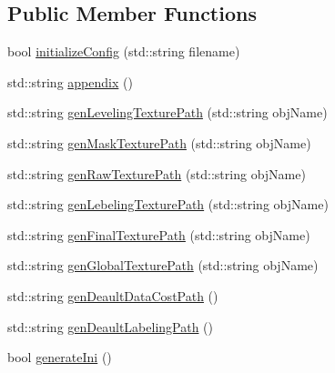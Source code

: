 \subsection*{Public Member Functions}
\begin{DoxyCompactItemize}
\item 
bool \hyperlink{struct_arguments_adb3df83131fa2be8783755b93c28c3de}{initialize\+Config} (std\+::string filename)
\item 
std\+::string \hyperlink{struct_arguments_a693a6a2a4334f5e34b3eb5ed6a555b28}{appendix} ()
\item 
std\+::string \hyperlink{struct_arguments_a84cff19e3bdd988ba096e1a81e747103}{gen\+Leveling\+Texture\+Path} (std\+::string obj\+Name)
\item 
std\+::string \hyperlink{struct_arguments_acc8d0c6a9477669bee3d9fe79e0b6d6c}{gen\+Mask\+Texture\+Path} (std\+::string obj\+Name)
\item 
std\+::string \hyperlink{struct_arguments_af256b45e3009486a4ea5066f8b7a080f}{gen\+Raw\+Texture\+Path} (std\+::string obj\+Name)
\item 
std\+::string \hyperlink{struct_arguments_ac2161fcafef758c6418e6d7113fedee2}{gen\+Lebeling\+Texture\+Path} (std\+::string obj\+Name)
\item 
std\+::string \hyperlink{struct_arguments_ae4c2ab8514254a581f2124d4095ffe06}{gen\+Final\+Texture\+Path} (std\+::string obj\+Name)
\item 
std\+::string \hyperlink{struct_arguments_ab6012180dadee8fff0a7271aafd96089}{gen\+Global\+Texture\+Path} (std\+::string obj\+Name)
\item 
std\+::string \hyperlink{struct_arguments_a3f54b425cb0c05cda997be2f690040a4}{gen\+Deault\+Data\+Cost\+Path} ()
\item 
std\+::string \hyperlink{struct_arguments_ad99ef1f1635874fd7dcac5b3a48dabec}{gen\+Deault\+Labeling\+Path} ()
\item 
bool \hyperlink{struct_arguments_a6db8fa82b73c39649ab151ef63085f0f}{generate\+Ini} ()
\end{DoxyCompactItemize}

